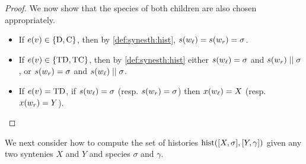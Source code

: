 \begin{proof}
    We now show that the species of both children are also chosen appropriately.
    \begin{itemize}
        \item If \(e(v) \in \{\mathrm{D}, \mathrm{C}\}\), then by \cref{def:synesth:hist},
            \(s(w_\mathit{\ell}) = s(w_r) = \sigma\).

        \item If \(e(v) \in \{\mathrm{TD}, \mathrm{TC}\}\), 
            then by \cref{def:synesth:hist}
            either \(s(w_\mathit{\ell}) = \sigma\) and \(s(w_r) \mathrel{||} \sigma\),
            or \(s(w_r) = \sigma\) and \(s(w_\mathit{\ell}) \mathrel{||} \sigma\).

        \item If \(e(v) = \mathrm{TD}\),
            if \(s(w_\mathit{\ell}) = \sigma\) (resp. \(s(w_r) = \sigma\))
            then \(x(w_\mathit{\ell}) = X\) (resp. \(x(w_r) = Y\)). \qedhere
    \end{itemize}
\end{proof}

We next consider how to compute the set of histories \(\mathrm{hist}([X, \sigma], [Y, \gamma])\) given any two syntenies \(X\) and \(Y\) and species \(\sigma\) and \(\gamma\).

